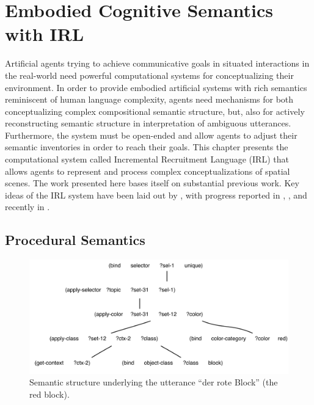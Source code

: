 %


\chapter{Embodied Cognitive Semantics with IRL}
\label{s:irl}
Artificial agents trying to achieve communicative goals in situated interactions
in the real-world need powerful computational systems for conceptualizing 
their environment. In order to provide 
embodied artificial systems with rich semantics reminiscent of human 
language complexity, agents need mechanisms for both conceptualizing complex 
compositional semantic structure, but, also for 
actively reconstructing semantic 
structure in interpretation of ambiguous utterances.
Furthermore, the system must be open-ended and 
allow agents to adjust their semantic inventories in order to reach their goals. 
This chapter presents the computational system called
Incremental Recruitment Language (IRL) 
that allows agents to represent and process complex conceptualizations
of spatial scenes. The work presented here bases itself on substantial previous work. 
Key ideas of the IRL system have been laid out by \cite{steels2000emergence}, 
with progress reported in \cite{steels2005planning}, \cite{vandenbroeck2008irl}, and
recently in \cite{spranger2010irl,spranger2012irl}.

\section{Procedural Semantics}
\label{s:grounded-procedural-semantics}
\begin{figure}
\center
\includegraphics[width=1\columnwidth]{figs/the-red-block-network}
\caption{Semantic structure underlying the utterance ``der rote Block'' (the red block).}
\label{f:the-red-block-network}
\end{figure}

